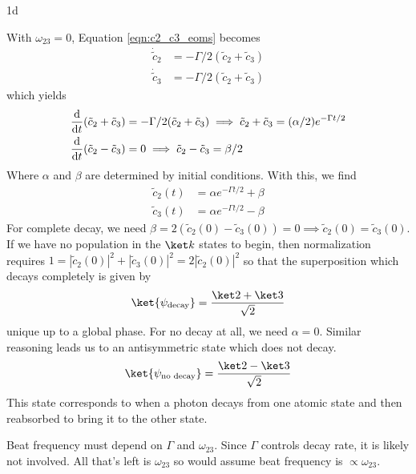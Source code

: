 \documentclass[12pt]{article}
\begin{document}
\begin{exc}{1d}
    
\end{exc}
\begin{ans}
    With $\omega_{23} = 0$, Equation \ref{eqn:c2_c3_eoms} becomes
    \begin{align*}
            \dot{\tilde c}_2 &= -\Gamma/2(\tilde c_2 + \tilde c_3) \\ 
        \dot{\tilde c}_3 &= -\Gamma/2(\tilde c_2 + \tilde c_3) 
    \end{align*}
    which yields 
    \begin{align*}
        \odv{}{t}(\tilde c_2 + \tilde c_3) &= -\Gamma/2 (\tilde c_2 + \tilde c_3) \implies \tilde c_2 + \tilde c_3 = (\alpha/2) e^{-\Gamma t/2} \\
        \odv{}{t}(\tilde c_2 - \tilde c_3) &= 0  \implies \tilde c_2 - \tilde c_3 = \beta/2
    \end{align*}
    Where $\alpha$ and $\beta$ are determined by initial conditions. With this, we find 
    \begin{align*}
        \tilde c_2(t) &= \alpha e^{-\Gamma t/2} + \beta \\ 
        \tilde c_3(t) &= \alpha e^{-\Gamma t/2} - \beta
    \end{align*}
    For complete decay, we need $\beta = 2(\tilde c_2(0) - \tilde c_3(0)) = 0 \implies \tilde c_2(0) = \tilde c_3(0)$. If we have no population in the $\ket k$ states to begin, then normalization requires $1 = |\tilde c_2(0)|^2 + |\tilde c_3(0)|^2 = 2|\tilde c_2(0)|^2$ so that the superposition which decays completely is given by 
    \begin{align*}
        \ket{\tub{\psi}{decay}} = \frac{\ket 2 + \ket 3}{\sqrt 2}
    \end{align*}
    unique up to a global phase. For no decay at all, we need $\alpha = 0$. Similar reasoning leads us to an antisymmetric state which does not decay. 
    \[
    \ket{\tub{\psi}{no decay}} = \frac{\ket 2 - \ket 3}{\sqrt 2}
    \]
    This state corresponds to when a photon decays from one atomic state and then reabsorbed to bring it to the other state.    

    Beat frequency must depend on $\Gamma$ and $\omega_{23}$. Since $\Gamma$ controls decay rate, it is likely not involved. All that's left is $\omega_{23}$ so would assume beat frequency is $\propto \omega_{23}$.
\end{ans}
\end{document}
